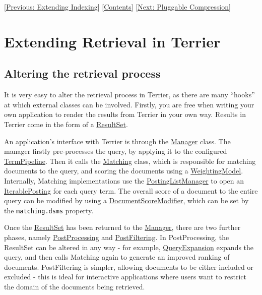 {[}\href{extend_indexing.html}{Previous: Extending Indexing}{]}
{[}\href{index.html}{Contents}{]} {[}\href{compression.html}{Next:
Pluggable Compression}{]}\\

\section{Extending Retrieval in
Terrier}\label{extending-retrieval-in-terrier}

\subsection{Altering the retrieval
process}\label{altering-the-retrieval-process}

It is very easy to alter the retrieval process in Terrier, as there are
many ``hooks'' at which external classes can be involved. Firstly, you
are free when writing your own application to render the results from
Terrier in your own way. Results in Terrier come in the form of a
\href{javadoc/org/terrier/matching/ResultSet.html}{ResultSet}.

An application's interface with Terrier is through the
\href{javadoc/org/terrier/querying/Manager.html}{Manager} class. The
manager firstly pre-processes the query, by applying it to the
configured
\href{javadoc/org/terrier/terms/TermPipeline.html}{TermPipeline}. Then
it calls the \href{}{Matching} class, which is responsible for matching
documents to the query, and scoring the documents using a
\href{javadoc/org/terrier/matching/models/WeightingModel.html}{WeightingModel}.
Internally, Matching implementations use the
\href{javadoc/org/terrier/matching/PostingListManager.html}{PostingListManager}
to open an
\href{javadoc/org/terrier/structures/postings/IterablePosting.html}{IterablePosting}
for each query term. The overall score of a document to the entire query
can be modified by using a
\href{javadoc/org/terrier/matching/dsms/DocumentScoreModifier.html}{DocumentScoreModifier},
which can be set by the \texttt{matching.dsms} property.

Once the \href{javadoc/org/terrier/matching/ResultSet.html}{ResultSet}
has been returned to the
\href{javadoc/org/terrier/querying/Manager.html}{Manager}, there are two
further phases, namely
\href{javadoc/org/terrier/querying/PostProcess.html}{PostProcessing} and
\href{javadoc/org/terrier/querying/PostFilter.html}{PostFiltering}. In
PostProcessing, the ResultSet can be altered in any way - for example,
\href{javadoc/org/terrier/querying/QueryExpansion.html}{QueryExpansion}
expands the query, and then calls Matching again to generate an improved
ranking of documents. PostFiltering is simpler, allowing documents to be
either included or excluded - this is ideal for interactive applications
where users want to restrict the domain of the documents being
retrieved.

